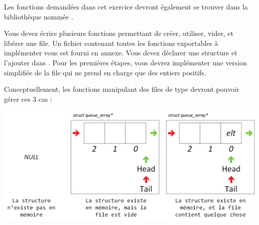 

\vspace*{0.7cm}

\noindent {}

\bigskip

\noindent Les fonctions demandées dans cet exercice devront également se trouver dans la bibliothèque nommée .

\bigskip

\noindent Vous devez écrire plusieurs fonctions permettant de créer, utiliser, vider, et libérer une file.
Un fichier  contenant toutes les fonctions exportables à implémenter vous est fourni en annexe.
Vous devez déclarer une structure  et l'ajouter dans .
Pour les premières étapes, vous devrez implémenter une version simplifiée de la file qui ne prend en charge que des entiers positifs.

\bigskip

\noindent Conceptuellement, les fonctions manipulant des files de type  devront pouvoir gérer ces 3 cas :

\bigskip

\begin{center}
\includegraphics[scale=0.85]{Cours/Files_Implementation_ARRAY.png}
\end{center}

\bigskip

